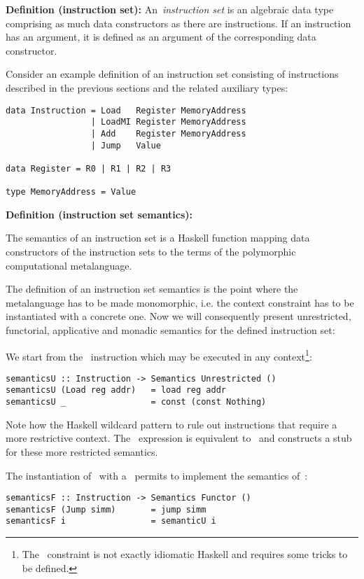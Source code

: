 \textbf{Definition (instruction set):} An~\emph{instruction set} is an algebraic data type
comprising as much data constructors as there are instructions.
If an instruction has an argument, it is defined as an argument of the corresponding data constructor.

Consider an example definition of an instruction set consisting
of instructions described in the previous sections and the related auxiliary types:

\begin{verbatim}
data Instruction = Load   Register MemoryAddress
                 | LoadMI Register MemoryAddress
                 | Add    Register MemoryAddress
                 | Jump   Value

data Register = R0 | R1 | R2 | R3

type MemoryAddress = Value
\end{verbatim}

\textbf{Definition (instruction set semantics):}

The semantics of an instruction set is a Haskell function mapping
data constructors of the instruction sets to the terms of the polymorphic
computational metalanguage.

The definition of an instruction set semantics is the point where the metalanguage
has to be made monomorphic, i.e. the context constraint has to be instantiated with
a concrete one. Now we will consequently present unrestricted, functorial,
applicative and monadic semantics for the defined instruction set:

We start from the~ instruction which may be executed in any
context\footnote{The~ constraint is not exactly idiomatic Haskell and
requires some tricks to be defined.}:

\begin{verbatim}
semanticsU :: Instruction -> Semantics Unrestricted ()
semanticsU (Load reg addr)   = load reg addr
semanticsU _                 = const (const Nothing)
\end{verbatim}

\noindent Note how the Haskell wildcard pattern to rule out instructions that require a more
restrictive context. The~ expression is equivalent
to~ and constructs a stub for these more restricted
semantics.

The instantiation of~ with a~ permits to implement the semantics
of~:

\begin{verbatim}
semanticsF :: Instruction -> Semantics Functor ()
semanticsF (Jump simm)       = jump simm
semanticsF i                 = semanticU i
\end{verbatim}

